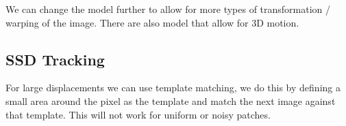We can change the model further to allow for more types of transformation / warping of the image. There are also model that allow for 3D motion.
 
 
\subsection{SSD Tracking}
 
For large displacements we can use template matching, we do this by defining a small area around the pixel as the template and match the next image against that template. This will not work for uniform or noisy patches.
 